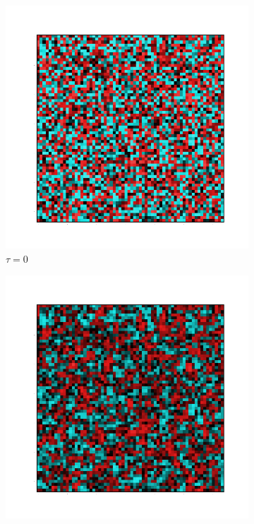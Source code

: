 \documentclass[12pt]{report}
\begin{document}
\begin{figure}[h]
  \centering
      \begin{subfigure}[b]{0.2\textwidth}\centering
        \includegraphics[width=\textwidth]{imgs/0.png}
        \caption{$\tau=0$}
      \end{subfigure}
      \hfill
      \begin{subfigure}[b]{0.2\textwidth}\centering
        \includegraphics[width=\textwidth]{imgs/0_5.png}

\end{subfigure}
\end{figure}
\end{document}

